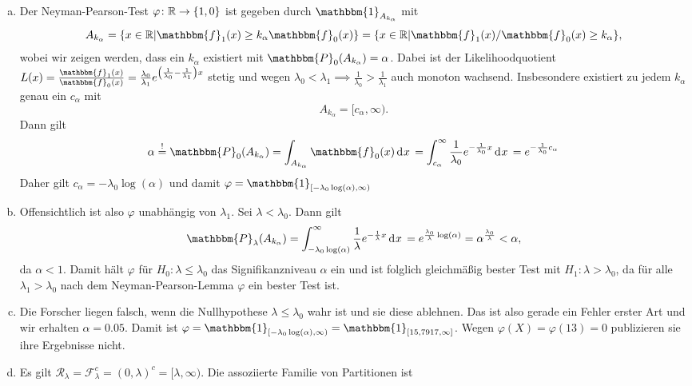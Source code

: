 \documentclass[uebung]{lecture}
\begin{document}
\begin{aufgabe}[]
    \begin{enumerate}[(a)]
        \item Der Neyman-Pearson-Test $\varphi \colon \mathbb{R} \to \{1,0\}$ ist gegeben durch $\mathbbm{1}_{A_{k_\alpha}}$ mit 
        \[
            A_{k_\alpha} = \{x \in \R | \mathbbm{f}_1(x) \geq k_\alpha \mathbbm{f}_0(x)\} = \{x \in \R | \mathbbm{f}_1(x) / \mathbbm{f}_0(x) \geq k_\alpha\},
        \] wobei wir zeigen werden, dass ein $k_\alpha$ existiert mit $\mathbbm{P}_0(A_{k_\alpha}) = \alpha$.
        Dabei ist der Likelihoodquotient $L(x) = \frac{\mathbbm{f}_1(x)}{\mathbbm{f}_0(x)} = \frac{\lambda_0}{\lambda_1} e^{\left(\frac{1}{\lambda_0} - \frac{1}{\lambda_1}\right) x}$ stetig und wegen $\lambda_0 < \lambda_1 \implies \frac{1}{\lambda_0} > \frac{1}{\lambda_1}$ auch monoton wachsend. Insbesondere existiert zu jedem $k_\alpha$ genau ein $c_\alpha$ mit
        \[
            A_{k_\alpha} = [c_\alpha, \infty). 
        \]
        Dann gilt
        \[
            \alpha \overset{!}{=} \mathbbm{P}_0(A_{k_\alpha}) = \int_{A_{k_\alpha}} \mathbbm{f}_0(x) \d{x} = \int_{c_\alpha}^\infty \frac{1}{\lambda_0}e^{- \frac{1}{\lambda_0} x} \d{x} = e^{- \frac{1}{\lambda_0} c_\alpha}
        \]
        Daher gilt $c_\alpha = -\lambda_0 \log(\alpha)$ und damit $\varphi = \mathbbm{1}_{[-\lambda_0\log(\alpha), \infty)}$
        \item Offensichtlich ist also $\varphi$ unabhängig von $\lambda_1$.
        Sei $\lambda < \lambda_0$. Dann gilt
        \[
            \mathbbm{P}_\lambda(A_{k_\alpha}) = \int_{-\lambda_0\log(\alpha)}^\infty \frac{1}{\lambda}e^{-\frac{1}{\lambda}x} \d{x} = e^{\frac{\lambda_0}{\lambda}\log(\alpha)} = \alpha^{\frac{\lambda_0}{\lambda}} < \alpha,
        \]
        da $\alpha < 1$. 
        Damit hält $\varphi$ für $H_0: \lambda \le \lambda_0$ das Signifikanzniveau $\alpha$ ein und ist folglich gleichmäßig bester Test mit $H_1: \lambda > \lambda_0$, da für alle $\lambda_1 > \lambda_0$ nach dem Neyman-Pearson-Lemma $\varphi$ ein bester Test ist.
        \item Die Forscher liegen falsch, wenn die Nullhypothese $\lambda \leq \lambda_0$ wahr ist und sie diese ablehnen. Das ist also gerade ein Fehler erster Art und wir erhalten $\alpha = 0.05$. Damit ist $\varphi = \mathbbm{1}_{[- \lambda_0 \log(\alpha), \infty)} = \mathbbm{1}_{[15,7917, \infty]}$. Wegen $\varphi(X) = \varphi(13) = 0$ publizieren sie ihre Ergebnisse nicht.
        \item Es gilt $\mathcal{R}_\lambda = \mathcal F_\lambda^c = (0,\lambda)^c = [\lambda, \infty)$. Die assoziierte Familie von Partitionen ist 

\end{enumerate}
\end{aufgabe}
\end{document}
